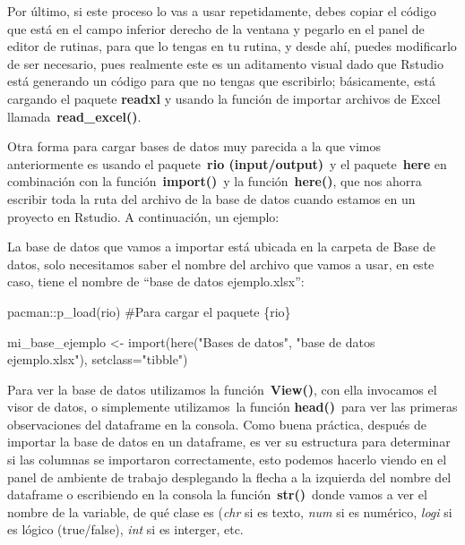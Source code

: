 \documentclass[
  letterpaper,
  DIV=11,
  numbers=noendperiod]{scrreprt}
\newenvironment{Shaded}{\begin{snugshade}}{\end{snugshade}}
\newcommand{\AttributeTok}[1]{\textcolor[rgb]{0.40,0.45,0.13}{#1}}
\newcommand{\CommentTok}[1]{\textcolor[rgb]{0.37,0.37,0.37}{#1}}
\newcommand{\FunctionTok}[1]{\textcolor[rgb]{0.28,0.35,0.67}{#1}}
\newcommand{\NormalTok}[1]{\textcolor[rgb]{0.00,0.23,0.31}{#1}}
\newcommand{\OtherTok}[1]{\textcolor[rgb]{0.00,0.23,0.31}{#1}}
\newcommand{\SpecialCharTok}[1]{\textcolor[rgb]{0.37,0.37,0.37}{#1}}
\newcommand{\StringTok}[1]{\textcolor[rgb]{0.13,0.47,0.30}{#1}}
\begin{document}
Por último, si este proceso lo vas a usar repetidamente, debes copiar el
código que está en el campo inferior derecho de la ventana y pegarlo en
el panel de editor de rutinas, para que lo tengas en tu rutina, y desde
ahí, puedes modificarlo de ser necesario, pues realmente este es un
aditamento visual dado que Rstudio está generando un código para que no
tengas que escribirlo; básicamente, está cargando el paquete
\textbf{readxl} y usando la función de importar archivos de Excel
llamada~\textbf{read\_excel()}.

Otra forma para cargar bases de datos muy parecida a la que vimos
anteriormente es usando el paquete~\textbf{rio (input/output)}~y el
paquete~\textbf{here} en combinación con la función~\textbf{import()}~y
la función~\textbf{here()}, que nos ahorra escribir toda la ruta del
archivo de la base de datos cuando estamos en un proyecto en Rstudio. A
continuación, un ejemplo:

La base de datos que vamos a importar está ubicada en la carpeta de Base
de datos, solo necesitamos saber el nombre del archivo que vamos a usar,
en este caso, tiene el nombre de ``base de datos ejemplo.xlsx'':

\begin{Shaded}
\begin{Highlighting}[]
\NormalTok{pacman}\SpecialCharTok{::}\FunctionTok{p\_load}\NormalTok{(rio) }\CommentTok{\#Para cargar el paquete \{rio\}}

\NormalTok{mi\_base\_ejemplo }\OtherTok{\textless{}{-}} \FunctionTok{import}\NormalTok{(}\FunctionTok{here}\NormalTok{(}\StringTok{"Bases de datos"}\NormalTok{, }\StringTok{"base de datos ejemplo.xlsx"}\NormalTok{), }\AttributeTok{setclass=}\StringTok{"tibble"}\NormalTok{)}
\end{Highlighting}
\end{Shaded}

Para ver la base de datos utilizamos la función~\textbf{View()}, con
ella invocamos el visor de datos, o simplemente utilizamos~la función
\textbf{head()}~para ver las primeras observaciones del dataframe en la
consola. Como buena práctica, después de importar la base de datos en un
dataframe, es ver su estructura para determinar si las columnas se
importaron correctamente, esto podemos hacerlo viendo en el panel de
ambiente de trabajo desplegando la flecha a la izquierda del nombre del
dataframe o escribiendo en la consola la función~\textbf{str()}~donde
vamos a ver el nombre de la variable, de qué clase es (\emph{chr} si es
texto, \emph{num} si es numérico, \emph{logi} si es lógico (true/false),
\emph{int} si es interger, etc.
\end{document}
